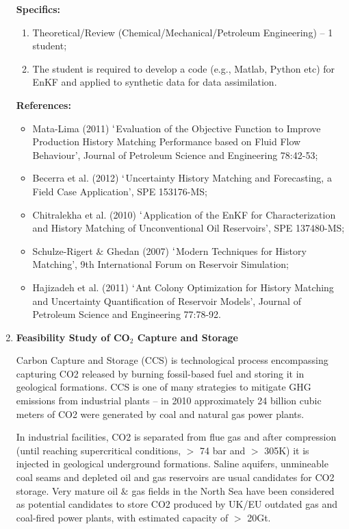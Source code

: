 \documentclass[12pts,a4paper,amsmath,amssymb,floatfix]{article}%
\begin{document}
\begin{enumerate}[label=\bfseries Project \arabic*:]
\noindent
{\bf Specifics:} 
\noindent
\begin{enumerate}
\item Theoretical/Review (Chemical/Mechanical/Petroleum Engineering) -- 1 student;
\item The student is required to develop a code (e.g., Matlab, Python etc) for EnKF and applied to synthetic data for data assimilation.
\end{enumerate}


\noindent
{\bf References:}
\begin{itemize}
\item Mata-Lima (2011) $\lq$Evaluation of the Objective Function to Improve Production History Matching Performance based on Fluid Flow Behaviour’, Journal of Petroleum Science and Engineering 78:42-53;
\item Becerra et al. (2012) $\lq$Uncertainty History Matching and Forecasting, a Field Case Application’, SPE 153176-MS;
\item Chitralekha et al.  (2010) $\lq$Application of the EnKF for Characterization and History Matching of Unconventional Oil Reservoirs’, SPE 137480-MS;
\item Schulze-Rigert $\&$ Ghedan (2007) $\lq$Modern Techniques for History Matching’, 9th International Forum on Reservoir Simulation;
\item Hajizadeh et al. (2011) $\lq$Ant Colony Optimization for History Matching and Uncertainty Quantification of Reservoir Models’, Journal of Petroleum Science and Engineering 77:78-92. 
\end{itemize}
%
\clearpage

\item {\bf Feasibility Study of CO$_{2}$ Capture and Storage}

Carbon Capture and Storage (CCS) is technological process encompassing capturing CO2 released by burning fossil-based fuel and storing it in geological formations. CCS is one of many strategies to mitigate GHG emissions from industrial plants – in 2010 approximately 24 billion cubic meters of CO2 were generated by coal and natural gas power plants. 


In industrial facilities, CO2 is separated from flue gas and after compression (until reaching supercritical conditions, $>$ 74 bar and $>$ 305K) it is injected in geological underground formations. Saline aquifers, unmineable coal seams and depleted oil and gas reservoirs are usual candidates for CO2 storage. Very mature oil $\&$ gas fields in the North Sea have been considered as potential candidates to store CO2 produced by UK/EU outdated gas and coal-fired power plants, with estimated capacity of $>$ 20Gt.


\end{enumerate}
\end{document}
